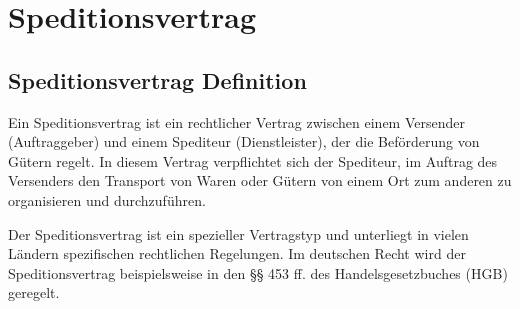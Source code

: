 
    \chapter[Speditionsvertrag]{Speditionsvertrag}

    \section{Speditionsvertrag Definition}

    Ein Speditionsvertrag ist ein rechtlicher Vertrag zwischen einem Versender (Auftraggeber) und einem Spediteur (Dienstleister), der die Beförderung von Gütern regelt. In diesem Vertrag verpflichtet sich der Spediteur, im Auftrag des Versenders den Transport von Waren oder Gütern von einem Ort zum anderen zu organisieren und durchzuführen.

    Der Speditionsvertrag ist ein spezieller Vertragstyp und unterliegt in vielen Ländern spezifischen rechtlichen Regelungen. Im deutschen Recht wird der Speditionsvertrag beispielsweise in den §§ 453 ff. des Handelsgesetzbuches (HGB) geregelt.

